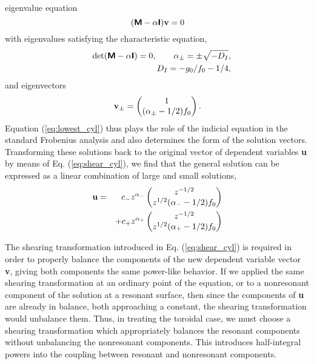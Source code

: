 \documentclass[prb,twocolumn,showpacs,preprintnumbers,amsmath,amssymb]{revtex4}
\renewcommand*{\v}[1]{\hbox{\bfseries #1}}
\renewcommand*{\t}[1]{\hbox{\sffamily\bfseries #1}}
\begin{document}
eigenvalue equation
\begin{equation}
(\t{M} - \alpha \t{I}) \v{v} = 0
\label{eq:lowest_cyl}
\end{equation}
with eigenvalues satisfying the characteristic equation,
\begin{eqnarray}
&&\det (\t{M} - \alpha \t{I}) = 0, \qquad
\alpha_\pm = \pm \sqrt{-D_I}, \nonumber \\
&&D_I = - g_0/f_0 - 1/4,
\label{eq:cyl_eigvals}
\end{eqnarray}
and eigenvectors
\[
\v{v}_\pm = \left( \begin{matrix} 1 \\ (\alpha_\pm - 1/2) f_0
\end{matrix} \right). 
\]
Equation (\ref{eq:lowest_cyl}) thus plays the role of the indicial
equation in the standard Frobenius analysis and also determines the form
of the solution vectors.  Transforming these solutions back to the
original vector of dependent variables \v{u} by means of
Eq. (\ref{eq:shear_cyl}), we find that the general solution can be
expressed as a linear combination of large and small solutions,
\begin{eqnarray}
\v{u}  =&& c_- z^{\alpha_-} 
	\left( \begin{matrix} z^{-1/2} \\ 
	z^{1/2} (\alpha_- - 1/2) f_0 \end{matrix} \right) \nonumber \\
&&+ c_+ z^{\alpha_+} 
	\left( \begin{matrix} z^{-1/2} \\ 
	z^{1/2} (\alpha_+ - 1/2) f_0 \end{matrix} \right)
\end{eqnarray}

The shearing transformation introduced in Eq. (\ref{eq:shear_cyl}) is
required in order to properly balance the components of the new
dependent variable vector \v{v}, giving both components the same
power-like behavior.  If we applied the same shearing transformation at
an ordinary point of the equation, or to a nonresonant component of the
solution at a resonant surface, then since the components of \v{u} are
already in balance, both approaching a constant, the shearing
transformation would unbalance them.  Thus, in treating the toroidal
case, we must choose a shearing transformation which appropriately
balances the resonant components without unbalancing the nonresonant
components.  This introduces half-integral powers into the coupling
between resonant and nonresonant components.
\end{document}

